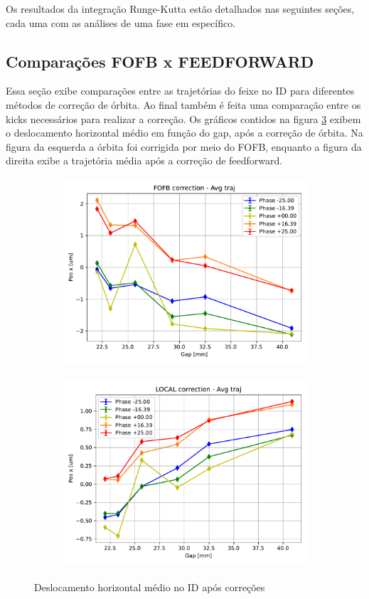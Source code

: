 \documentclass[a4paper,12pt]{article}
\begin{document}
Os resultados da integração Runge-Kutta estão detalhados nas seguintes seções, cada uma com as análises de uma fase em específico.


\subsection{Comparações FOFB x FEEDFORWARD}
Essa seção exibe comparações entre as trajetórias do feixe no ID para diferentes métodos de correção de órbita. Ao final também é feita uma comparação entre os kicks necessários para realizar a correção.
Os gráficos contidos na figura \ref{fig:trajx} exibem o deslocamento horizontal médio em função do gap, após a correção de órbita. Na figura da esquerda a órbita foi corrigida por meio do FOFB, enquanto a figura da direita exibe a trajetória média após a correção de feedforward.

\begin{figure}[H]
\begin{subfigure}{0.5\textwidth}
\includegraphics[width=0.9\linewidth, height=7cm]{figs/FOFB-avg-trajx.pdf} 
\label{fig:subimfofbtx}
\end{subfigure}
\begin{subfigure}{0.5\textwidth}
\includegraphics[width=0.9\linewidth, height=7cm]{figs/LOCAL-avg-trajx.pdf}
\label{fig:subimlocaltx}
\end{subfigure}
\caption{Deslocamento horizontal médio no ID após correções}
\label{fig:trajx}
\end{figure}
\end{document}
